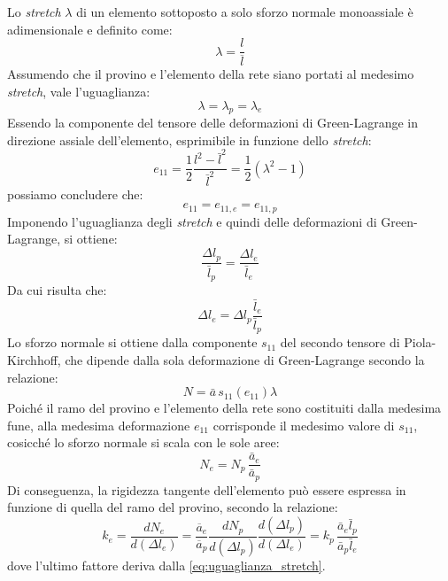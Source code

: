Lo \textit{stretch} $\lambda$ di un elemento sottoposto a solo sforzo normale monoassiale è adimensionale e definito come:
\begin{equation}
    \lambda =  \frac{l}{\overline{l}}
    \label{eq:stretch}
\end{equation}
Assumendo che il provino e l'elemento della rete siano portati al medesimo \textit{stretch}, vale l'uguaglianza:
\begin{equation}
    \lambda = \lambda_p = \lambda_e
    \label{eq:generalizzazione_stretch}
\end{equation}
Essendo la componente del tensore delle deformazioni di Green-Lagrange in direzione assiale dell'elemento, esprimibile in funzione dello \textit{stretch}:
\begin{equation}
    e_{11} = \frac{1}{2} \frac{l^2 - \bar{l}^2}{\bar{l}^2} = \frac{1}{2} (\lambda^2 - 1)
\end{equation}
possiamo concludere che:
\begin{equation}
     e_{11} = e_{11,e} = e_{11,p} 
\end{equation}
Imponendo l'uguaglianza degli \textit{stretch} e quindi delle deformazioni di Green-Lagrange, si ottiene:
\begin{equation}
    \frac{\Delta l_p}{\bar{l}_p} = \frac{\Delta l_e}{\bar{l}_e}
    \label{eq:uguaglianza_stretch}
\end{equation}
Da cui risulta che: 
\begin{equation}
    \Delta l_e = \Delta l_p \frac{\bar{l}_e}{\bar{l}_p} 
\end{equation}
Lo sforzo normale si ottiene dalla componente $s_{11}$ del secondo tensore di Piola-Kirchhoff, che dipende dalla sola deformazione di Green-Lagrange secondo la relazione:
\begin{equation}
    N = \bar{a} \, s_{11}(e_{11})\lambda
    \label{eq:N_s_11}
\end{equation}
Poiché il ramo del provino e l'elemento della rete sono costituiti dalla medesima fune, alla medesima deformazione $e_{11}$ corrisponde il medesimo valore di $s_{11}$, cosicché lo sforzo normale si scala con le sole aree:
\begin{equation}
    N_e = N_p \, \frac{\bar{a}_e}{\bar{a}_p} 
\end{equation}
Di conseguenza, la rigidezza tangente dell'elemento può essere espressa in funzione di quella del ramo del provino, secondo la relazione:
\begin{equation}
    k_{e} = \frac{dN_e}{d(\Delta l_e)} = \frac{\overline{a}_e}{\overline{a}_p} \frac{dN_p}{d(\Delta l_p)} \frac{d(\Delta l_p)}{d(\Delta l_e)} = k_{p} \, \frac{\bar{a}_e \bar{l}_p}{\bar{a}_p \bar{l}_e}  
\end{equation}
dove l'ultimo fattore deriva dalla \eqref{eq:uguaglianza_stretch}.

